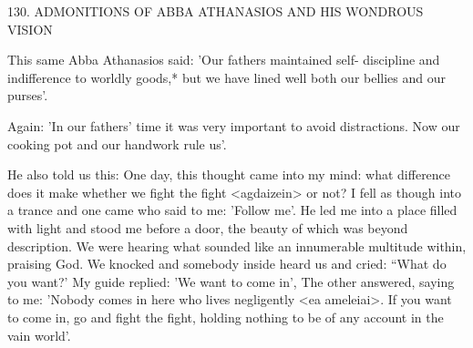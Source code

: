 130.
ADMONITIONS OF ABBA ATHANASIOS
AND HIS WONDROUS VISION

This same Abba Athanasios said: 'Our fathers maintained self-
discipline and indifference to worldly goods,* but we have lined well
both our bellies and our purses'.

Again: 'In our fathers' time it was very important to avoid
distractions.
Now our cooking pot and our handwork rule us'.

He also told us this:
One day, this thought came into my mind: what difference does it
make whether we fight the fight <agdaizein> or not? I fell as
though into a trance and one came who said to me: 'Follow me'.
He
led me into a place filled with light and stood me before a door, the
beauty of which was beyond description.
We were hearing what
sounded like an innumerable multitude within, praising God.
We
knocked and somebody inside heard us and cried: “What do you
want?' My guide replied: 'We want to come in', The other answered,
saying to me: 'Nobody comes in here who lives negligently <ea
ameleiai>.
If you want to come in, go and fight the fight, holding
nothing to be of any account in the vain world'.


